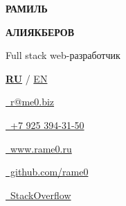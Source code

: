 \documentclass[10pt]{tpl/developercv} %
\begin{document}

\begin{minipage}[t]{0.44\textwidth} %
	\vspace{-\baselineskip} %

	{\Huge{\textbf{\textcolor{mainblue}{\MakeUppercase{Рамиль}}}}} %

	\vspace{4pt}

	{\Huge{\textbf{\textcolor{mainblue}{\MakeUppercase{Алиякберов}}}}} %

	\vspace{6pt}

  \large{Full stack web-разработчик} %

  \vspace{6pt}

  \textbf{\underline{RU}} / \href{https://rame0.github.io/resume-latex/resume_en.pdf}{EN}

\end{minipage}
\begin{minipage}[t]{0.275\textwidth} %
	\vspace{-\baselineskip} %


	\href{mailto:r@me0.biz}{\ r@me0.biz}

	\href{tel:+79253943150}{\ +7 925 394-31-50}
\end{minipage}
\begin{minipage}[t]{0.275\textwidth} %
	\vspace{-\baselineskip} %

	\href{https://www.rame0.ru/}{\ www.rame0.ru}

	\href{https://github.com/rame0}{\ github.com/rame0}

	\href{https://stackoverflow.com/users/513723/rame0}{\ StackOverflow}

\end{minipage}
\end{document}
